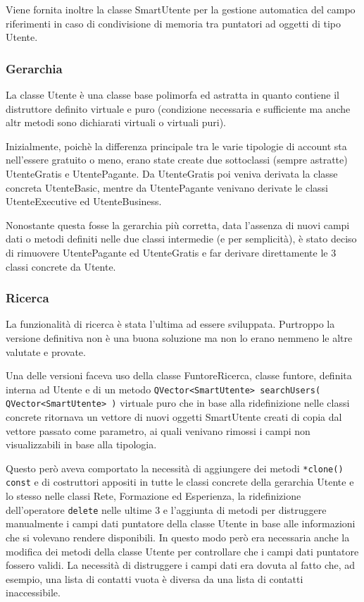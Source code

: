 \documentclass[a4paper,openany]{article}
\begin{document}
Viene fornita inoltre la classe SmartUtente per la gestione automatica del campo riferimenti in caso di condivisione di memoria tra puntatori ad oggetti di tipo Utente.

\subsubsection*{Gerarchia}
La classe Utente è una classe base polimorfa ed astratta in quanto contiene il distruttore definito virtuale e puro (condizione necessaria e sufficiente ma anche altr metodi sono dichiarati virtuali o virtuali puri).

Inizialmente, poichè la differenza principale tra le varie tipologie di account sta nell'essere gratuito o meno, erano state create due sottoclassi (sempre astratte) UtenteGratis e UtentePagante. Da UtenteGratis poi veniva derivata la classe concreta UtenteBasic, mentre da UtentePagante venivano derivate le classi UtenteExecutive ed UtenteBusiness.

Nonostante questa fosse la gerarchia più corretta, data l'assenza di nuovi campi dati o metodi definiti nelle due classi intermedie (e per semplicità), è stato deciso di rimuovere UtentePagante ed UtenteGratis e far derivare direttamente le 3 classi concrete da Utente.

\subsubsection*{Ricerca}
La funzionalità di ricerca è stata l'ultima ad essere sviluppata. Purtroppo la versione definitiva non è una buona soluzione ma non lo erano nemmeno le altre valutate e provate.

Una delle versioni faceva uso della classe FuntoreRicerca, classe funtore, definita interna ad Utente e di un metodo \texttt{QVector<SmartUtente> searchUsers( QVector<SmartUtente> )} virtuale puro che in base alla ridefinizione nelle classi concrete ritornava un vettore di nuovi oggetti SmartUtente creati di copia dal vettore passato come parametro, ai quali venivano rimossi i campi non visualizzabili in base alla tipologia. 

Questo però aveva comportato la necessità di aggiungere dei metodi \texttt{*clone() const} e di costruttori appositi in tutte le classi concrete della gerarchia Utente e lo stesso nelle classi Rete, Formazione ed Esperienza, la ridefinizione dell'operatore \texttt{delete} nelle ultime 3 e l'aggiunta di metodi per distruggere manualmente i campi dati puntatore della classe Utente in base alle informazioni che si volevano rendere disponibili. In questo modo però era necessaria anche la modifica dei metodi della classe Utente per controllare che i campi dati puntatore fossero validi. La necessità di distruggere i campi dati era dovuta al fatto che, ad esempio, una lista di contatti vuota è diversa da una lista di contatti inaccessibile.
\end{document}
